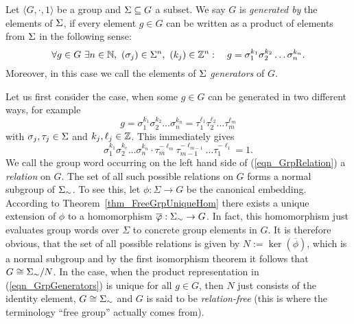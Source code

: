 
\begin{definition}
Let $\langle G, \cdot, 1 \rangle$ be a group and $\Sigma \subseteq G$ a subset. We say $G$ is \emph{generated by} the elements of $\Sigma$, if every element $g \in G$ can be written as a product of elements from $\Sigma$ in the following sense:
\begin{equation}
\label{eqn_GrpGenerators}
\forall g \in G\ \exists n \in \mathbb{N},\ (\sigma_j) \in \Sigma^n,\ (k_j) \in \mathbb{Z}^n:\quad 
g = \sigma_1^{k_1} \sigma_2^{k_2} \dots \sigma_n^{k_n}.
\end{equation}
Moreover, in this case we call the elements of $\Sigma$ \emph{generators} of $G$. 
\end{definition}

Let us first consider the case, when some $g \in G$ can be generated in two  different ways, for example
\begin{equation*}
g = \sigma_1^{k_1} \sigma_2^{k_2} \dots \sigma_n^{k_n} 
  = \tau_1^{\ell_1} \tau_2^{\ell_2} \dots \tau_m^{\ell_m}
\end{equation*}
with $\sigma_j, \tau_j \in \Sigma$ and $k_j, \ell_j \in \mathbb{Z}$. This immediately gives
\begin{equation}
\label{eqn_GrpRelation}
\sigma_1^{k_1} \sigma_2^{k_e} \dots \sigma_n^{k_n} \cdot
\tau_m^{-\ell_m} \tau_{m-1}^{-\ell_{m-1}} \dots \tau_1^{-\ell_1} = 1.
\end{equation}
We call the group word occurring on the left hand side of (\ref{eqn_GrpRelation}) a \emph{relation} on $G$. The set of all such possible relations on $G$ forms a normal subgroup of ${\Sigma}_{\sim}$. To see this, let $\phi : \Sigma \to G$ be the canonical embedding. According to Theorem~\ref{thm_FreeGrpUniqueHom} there exists a unique extension of $\phi$ to a homomorphism $\overline{\varphi}: {\Sigma}_{\sim} \to G$. In fact, this homomorphism just evaluates group words over $\Sigma$ to concrete group elements in $G$. It is therefore obvious, that the set of all possible relations is given by $N := \ker(\overline{\phi})$, which is a normal subgroup and by the first isomorphism theorem it follows that $G \cong {\Sigma}_{\sim} / N$. In the case, when the product representation in (\ref{eqn_GrpGenerators}) is unique for all $g \in G$, then $N$ just consists of the identity element, $G \cong {\Sigma}_{\sim}$ and $G$ is said to be \emph{relation-free} (this is where the terminology ``free group'' actually comes from). 

